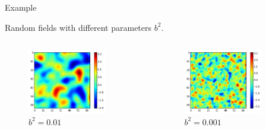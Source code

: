 \documentclass[12pt]{beamer}
\begin{document}
\begin{frame}{Example}
\begin{center}
Random fields with different parameters $b^2$.
\end{center}

\begin{columns}
\begin{figure}[!ht]
\centering
\includegraphics[width=0.8\textwidth]{rand_field1e-2.png}
\caption{$b^2 = 0.01$}
\end{figure}

\begin{figure}[!ht]
\centering
\includegraphics[width=0.8\textwidth]{rand_field1e-3.png}
\caption{$b^2 = 0.001$}
\end{figure}
\end{columns}
\end{frame}
\end{document}

